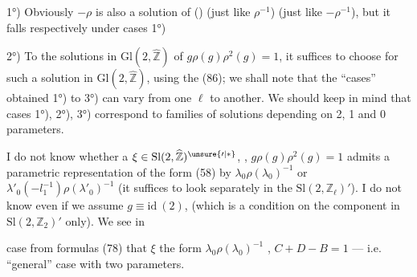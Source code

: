 

  1°) Obviously $-\rho$ is also a solution of ()
(just like $\rho^{-1}$) 
(just like $-\rho^{-1}$), but it falls
respectively under cases  1°) 

2°) To  the solutions in $\mathrm{Gl}(2,\widehat{\mathbb Z})$
of $g\rho(g)\rho^2(g)=1$, it suffices to choose for
\unsure{$\forall\,\ell$} such a solution in $\mathrm{Gl}(2,\widehat{\mathbb Z})$, using
the  (86); we shall note that
the ``cases'' obtained 1°) to 3°) can vary from one
$\ell$ to another. 
We should keep in mind that cases 1°), 2°), 3°)
correspond  to families of
solutions depending on 2, 1 and 0 parameters.

 I do not know whether a $\xi\in\mathrm{Sl}(2,\widehat{\mathbb Z})^{\unsure{\prime|*}}$, , 
$g\rho(g)\rho^2(g)=1$ admits a parametric
representation of the form (58)
by $\lambda_0\rho(\lambda_0)^{-1}$ or $\lambda'_0(-l_1^{-1})\rho(\lambda'_0)^{-1}$
(it suffices
to look separately in the $\mathrm{Sl}(2,\mathbb Z_\ell)'$).
I do not know even if we assume $g\equiv\mathrm{id}\ (2)$,
(which is a condition on the component
in $\mathrm{Sl}(2,\mathbb Z_2)'$ only). We see in



 case from formulas (78) that  $\xi$
 the form $\lambda_0\rho(\lambda_0)^{-1}$
,
 
 $C+D-B=1$ --- i.e. 
 ``general'' case with two parameters.

